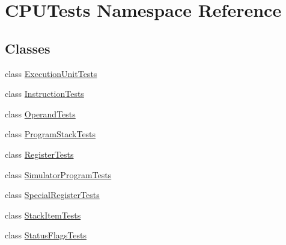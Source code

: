 \hypertarget{namespace_c_p_u_tests}{}\section{C\+P\+U\+Tests Namespace Reference}
\label{namespace_c_p_u_tests}
\subsection*{Classes}
\begin{DoxyCompactItemize}
\item 
class \hyperlink{class_c_p_u_tests_1_1_execution_unit_tests}{Execution\+Unit\+Tests}
\item 
class \hyperlink{class_c_p_u_tests_1_1_instruction_tests}{Instruction\+Tests}
\item 
class \hyperlink{class_c_p_u_tests_1_1_operand_tests}{Operand\+Tests}
\item 
class \hyperlink{class_c_p_u_tests_1_1_program_stack_tests}{Program\+Stack\+Tests}
\item 
class \hyperlink{class_c_p_u_tests_1_1_register_tests}{Register\+Tests}
\item 
class \hyperlink{class_c_p_u_tests_1_1_simulator_program_tests}{Simulator\+Program\+Tests}
\item 
class \hyperlink{class_c_p_u_tests_1_1_special_register_tests}{Special\+Register\+Tests}
\item 
class \hyperlink{class_c_p_u_tests_1_1_stack_item_tests}{Stack\+Item\+Tests}
\item 
class \hyperlink{class_c_p_u_tests_1_1_status_flags_tests}{Status\+Flags\+Tests}
\end{DoxyCompactItemize}
